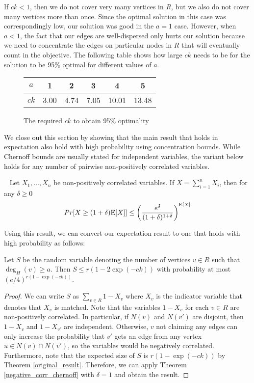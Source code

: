 If $ck<1$, then we do not cover very
many vertices in $R$, but we also do not cover many vertices more than
once. Since the optimal solution in this case was correspondingly low,
our solution was good in the $a=1$ case. However, when $a<1$, the fact
that our edges are well-dispersed only hurts our solution because we
need to concentrate the edges on particular nodes in $R$ that will
eventually count in the objective. The following table shows how large 
$ck$ needs to be for the solution to be 95\% optimal for different
values of $a$.

\begin{figure}[h]
  \centering
  \begin{tabular}{ |c|c|c|c|c|c| }
    \hline
    $a$ & 1 & 2 & 3 & 4 & 5 \\ \hline
    $ck$ & 3.00 & 4.74 & 7.05 & 10.01 & 13.48 \\
    \hline
  \end{tabular}
  \caption{The required $ck$ to obtain 95\% optimality}
\end{figure} 

We close out this section by showing that the main result that holds in expectation also hold with high probability using concentration bounds. 
While Chernoff bounds are usually stated for independent variables, the
variant below holds for any number of pairwise non-positively correlated
variables.

\begin{thm}\label{negative_corr_chernoff}~\cite{AugerDoerr2011}
Let $X_1,\ldots, X_n$ be non-positively correlated variables. If $X=\sum_{i=1}^n X_i$, then for any $\delta\geq 0$
\[ Pr[X \geq (1+\delta)\text{E}[X] ] \leq \left(\frac{e^\delta}{(1+\delta)^{1+\delta}}\right)^{\text{E}[X]} \]
\end{thm}

Using this result, we can convert our expectation result to one that holds
with high probability as follows:

\begin{thm}
Let $S$ be the random variable denoting the number of vertices $v \in R$ such that $\deg_{H}(v)\geq a$. Then
$ S \leq r(1-2\exp(-ck))$ with probability at most $(e/4)^{r(1-\exp(-ck))}$.
\end{thm}

\begin{proof}
We can write $S$ as $\sum_{v\in R} 1-X_v$ where $X_v$ is the indicator
variable that denotes that $X_v$ is matched. Note that the variables 
$1-X_v$ for each $v\in R$ are non-positively correlated. In particular,
if $N(v)$ and $N(v')$ are disjoint, then $1-X_v$ and $1-X_{v'}$ are 
independent. Otherwise, $v$ not claiming any edges can only increase 
the probability that $v'$ gets an edge from any vertex
$u\in N(v)\cap N(v')$, so the variables would be negatively correlated.
Furthermore, note that the expected size of $S$ is $r(1-\exp(-ck))$ by
Theorem \ref{original_result}. Therefore, we can apply Theorem 
\ref{negative_corr_chernoff} with $\delta=1$ and obtain the result.
\end{proof}
